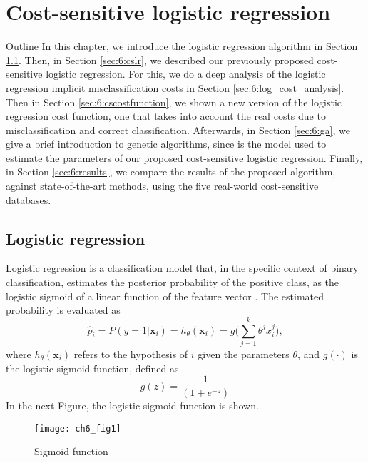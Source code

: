 \chapter{Cost-sensitive logistic regression}

\begin{remark}{Outline}
In this chapter, we introduce the logistic regression algorithm in Section 
\ref{sec:6:logistic}. Then, in Section \ref{sec:6:cslr}, we described our previously proposed 
cost-sensitive logistic regression. For this, we do a deep analysis of the logistic regression 
implicit misclassification costs in Section \ref{sec:6:log_cost_analysis}. Then in Section 
\ref{sec:6:cscostfunction}, we shown a new version of the logistic regression cost function, one 
that takes into account the real costs due to misclassification and correct classification. 
Afterwards, in Section \ref{sec:6:ga}, we give a brief introduction to genetic algorithms, since is 
the model used to estimate the parameters of our proposed cost-sensitive logistic regression. 
Finally, in Section \ref{sec:6:results}, we compare the results of the proposed algorithm, against 
state-of-the-art methods, using the five real-world cost-sensitive databases.
\end{remark}


\section{Logistic regression}
\label{sec:6:logistic}

Logistic regression is a classification model that, in the specific context of binary 
classification, estimates the posterior probability of the positive class, as the logistic sigmoid 
of a linear function of the feature vector \citep{Bishop2006}. The estimated probability  is 
evaluated as 
\begin{equation}
  \hat p_i = P(y=1 \vert \mathbf{x}_i) = h_{\theta}(\mathbf{x}_i) = 
  g\bigg(\sum_{j=1}^{k}{\theta^jx_i^j}\bigg),
\end{equation}
where $h_\theta(\mathbf{x}_i)$ refers to the hypothesis of $i$ given the parameters $\theta$,  
and  $g(\cdot)$ is the logistic sigmoid function, defined as
\begin{equation}
  g(z)=\frac{1}{(1+e^{-z})} 
\end{equation}
In the next Figure, the logistic sigmoid function is shown.
\begin{figure}[htbp]
  \centering
  \texttt{[image: ch6\_fig1]}
  \caption{Sigmoid function}
  \label{fig:ch6:1}
\end{figure}

